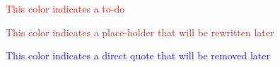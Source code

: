 \documentclass[final,american]{include/RaM/RaM-MScReport}
\begin{document}

\frontmatter


\maketitle

{\huge \textcolor{red}{This color indicates a to-do} 

\textcolor{brown}{This color indicates a place-holder that will be rewritten later} 

\textcolor{blue}{This color indicates a direct quote that will be removed later}}

%
\cleardoublepage



\tableofcontents


\mainmatter









\appendix


\backmatter

%

\label{ch:bib} %
 
\end{document}
